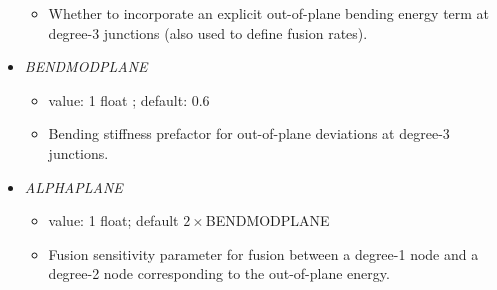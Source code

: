 \documentclass[12pt]{article}
\begin{document}
\begin{itemize}
\begin{itemize}
      \item Whether to incorporate an explicit out-of-plane bending energy term at degree-3 junctions (also used to define fusion rates).
    \end{itemize}
  \item {\it BENDMODPLANE}
    \begin{itemize}
      \item  value: 1 float ; default: $0.6$
      \item  Bending stiffness prefactor for out-of-plane deviations at degree-3 junctions.
    \end{itemize}
  \item {\it ALPHAPLANE}
    \begin{itemize}
      \item  value: 1 float; default $2\times$BENDMODPLANE
      \item Fusion sensitivity parameter for fusion between a degree-1 node and a degree-2 node corresponding to the out-of-plane energy.
    \end{itemize}
\end{itemize}
  
\end{document}
